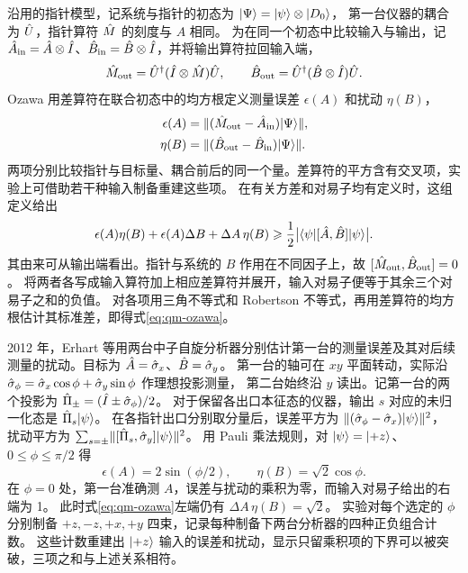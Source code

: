 沿用的指针模型，记系统与指针的初态为 $\lvert\Psi\rangle = \lvert\psi\rangle\otimes\lvert D_0\rangle$，
第一台仪器的耦合为 $\hat{U}$，指针算符 $\hat{M}$ 的刻度与 $A$ 相同。
为在同一个初态中比较输入与输出，记 $\hat{A}_{\mathrm{in}} = \hat{A}\otimes\hat{I}$、$\hat{B}_{\mathrm{in}} = \hat{B}\otimes\hat{I}$，并将输出算符拉回输入端，
\[
    \hat{M}_{\mathrm{out}} = \hat{U}^\dagger(\hat{I}\otimes\hat{M})\hat{U},\qquad
    \hat{B}_{\mathrm{out}} = \hat{U}^\dagger(\hat{B}\otimes\hat{I})\hat{U} .
\]
Ozawa 用差算符在联合初态中的均方根定义测量误差 $\epsilon(A)$ 和扰动 $\eta(B)$\cite{ozawa-noise}，
\begin{subequations}
    \begin{align}
        \epsilon(A) &= \lVert(\hat{M}_{\mathrm{out}} - \hat{A}_{\mathrm{in}})\lvert\Psi\rangle\rVert,\\
        \eta(B) &= \lVert(\hat{B}_{\mathrm{out}} - \hat{B}_{\mathrm{in}})\lvert\Psi\rangle\rVert.
    \end{align}
\end{subequations}
两项分别比较指针与目标量、耦合前后的同一个量。差算符的平方含有交叉项，实验上可借助若干种输入制备重建这些项。
在有关方差和对易子均有定义时，这组定义给出
\begin{equation}\label{eq:qm-ozawa}
    \epsilon(A)\eta(B) + \epsilon(A)\Delta B + \Delta A\,\eta(B)
        \geqslant \frac12\bigl\lvert\langle\psi\vert[\hat{A},\hat{B}]\vert\psi\rangle\bigr\rvert .
\end{equation}
其由来可从输出端看出。指针与系统的 $B$ 作用在不同因子上，故 $[\hat{M}_{\mathrm{out}},\hat{B}_{\mathrm{out}}] = 0$。
将两者各写成输入算符加上相应差算符并展开，输入对易子便等于其余三个对易子之和的负值。
对各项用三角不等式和 Robertson 不等式，再用差算符的均方根估计其标准差，即得式\eqref{eq:qm-ozawa}。

2012 年，\label{exp:qm-neutron-disturbance}Erhart 等用两台中子自旋分析器分别估计第一台的测量误差及其对后续测量的扰动\cite{erhart-neutron}。目标为 $\hat{A} = \hat{\sigma}_x$、$\hat{B} = \hat{\sigma}_y$。
第一台的轴可在 $xy$ 平面转动，实际沿 $\hat{\sigma}_\phi = \hat{\sigma}_x\cos\phi + \hat{\sigma}_y\sin\phi$ 作理想投影测量，
第二台始终沿 $y$ 读出。记第一台的两个投影为 $\hat{\Pi}_\pm = (\hat{I} \pm \hat{\sigma}_\phi)/2$。
对于保留各出口本征态的仪器，输出 $s$ 对应的未归一化态是 $\hat{\Pi}_s\lvert\psi\rangle$。
在各指针出口分别取分量后，误差平方为 $\lVert(\hat{\sigma}_\phi - \hat{\sigma}_x)\lvert\psi\rangle\rVert^2$，
扰动平方为 $\textstyle\sum_{s=\pm}\lVert[\hat{\Pi}_s,\hat{\sigma}_y]\lvert\psi\rangle\rVert^2$。
用 Pauli 乘法规则，对 $\lvert\psi\rangle = \lvert+z\rangle$、$0 \le \phi \le \pi/2$ 得
\[
    \epsilon(A) = 2\sin(\phi/2),\qquad \eta(B) = \sqrt{2}\cos\phi .
\]
在 $\phi = 0$ 处，第一台准确测 $A$，误差与扰动的乘积为零，而输入对易子给出的右端为 1。
此时式\eqref{eq:qm-ozawa}左端仍有 $\Delta A\,\eta(B) = \sqrt{2}$。
实验对每个选定的 $\phi$ 分别制备 $+z,-z,+x,+y$ 四束，记录每种制备下两台分析器的四种正负组合计数。
这些计数重建出 $\lvert+z\rangle$ 输入的误差和扰动，显示只留乘积项的下界可以被突破，三项之和与上述关系相符。

